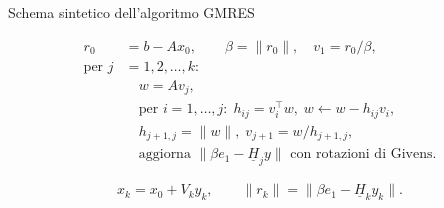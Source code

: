 \documentclass[aspectratio=169]{beamer}
\begin{document}
\begin{frame}{Schema sintetico dell'algoritmo GMRES}
\begin{block}{}
\begin{align*}
r_0 &= b - A x_0, \qquad \beta = \|r_0\|, \quad v_1 = r_0 / \beta,\\
\text{per } j &= 1,2,\dots,k:\\
&\quad w = A v_j,\\
&\quad \text{per } i=1,\dots,j:\; h_{ij} = v_i^\top w,\; w \leftarrow w - h_{ij}v_i,\\
&\quad h_{j+1,j} = \|w\|,\; v_{j+1} = w / h_{j+1,j},\\
&\quad \text{aggiorna } \|\beta e_1 - \underline{H}_j y\| \text{ con rotazioni di Givens.}
\end{align*}
\end{block}

\[
x_k = x_0 + V_k y_k, \qquad \|r_k\| = \|\beta e_1 - \underline{H}_k y_k\|.
\]
\end{frame}
\end{document}
